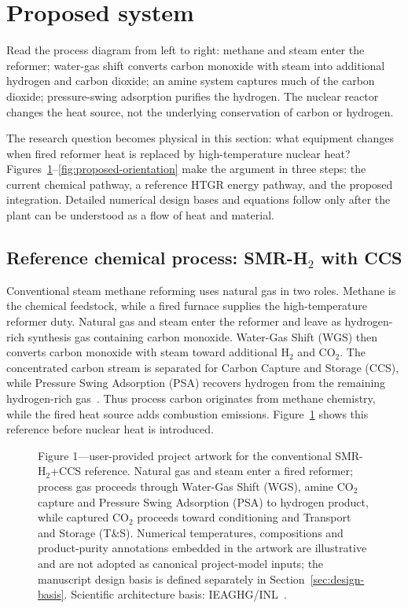 \section{Proposed system}\label{sec:proposed-system}

Read the process diagram from left to right: methane and steam enter the reformer; water-gas shift converts carbon monoxide with steam into additional hydrogen and carbon dioxide; an amine system captures much of the carbon dioxide; pressure-swing adsorption purifies the hydrogen. The nuclear reactor changes the heat source, not the underlying conservation of carbon or hydrogen.

The research question becomes physical in this section: what equipment changes when fired reformer heat is replaced by high-temperature nuclear heat? Figures~\ref{fig:smr-explainer}--\ref{fig:proposed-orientation} make the argument in three steps: the current chemical pathway, a reference HTGR energy pathway, and the proposed integration. Detailed numerical design bases and equations follow only after the plant can be understood as a flow of heat and material.

\subsection{Reference chemical process: SMR-H$_2$ with CCS}
Conventional steam methane reforming uses natural gas in two roles. Methane is the chemical feedstock, while a fired furnace supplies the high-temperature reformer duty. Natural gas and steam enter the reformer and leave as hydrogen-rich synthesis gas containing carbon monoxide. Water-Gas Shift (WGS) then converts carbon monoxide with steam toward additional H$_2$ and CO$_2$. The concentrated carbon stream is separated for Carbon Capture and Storage (CCS), while Pressure Swing Adsorption (PSA) recovers hydrogen from the remaining hydrogen-rich gas~\cite{ieaghg2017smr,inltev953}. Thus process carbon originates from methane chemistry, while the fired heat source adds combustion emissions. Figure~\ref{fig:smr-explainer} shows this reference before nuclear heat is introduced.

\begin{figure}[htbp]\centering
{}
\caption{Figure 1---user-provided project artwork for the conventional SMR-H$_2$+CCS reference. Natural gas and steam enter a fired reformer; process gas proceeds through Water-Gas Shift (WGS), amine CO$_2$ capture and Pressure Swing Adsorption (PSA) to hydrogen product, while captured CO$_2$ proceeds toward conditioning and Transport and Storage (T\&S). Numerical temperatures, compositions and product-purity annotations embedded in the artwork are illustrative and are not adopted as canonical project-model inputs; the manuscript design basis is defined separately in Section~\ref{sec:design-basis}. Scientific architecture basis: IEAGHG/INL~\cite{ieaghg2017smr,inltev953}.}
\label{fig:smr-explainer}
\end{figure}

